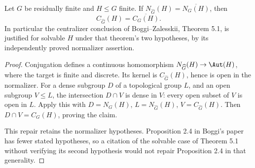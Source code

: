 Let \(G\) be residually finite and \(H\leq G\) finite. If
\(N_{\widehat G}(H)=\overline{N_G(H)}\), then
\[
 C_{\widehat G}(H)=\overline{C_G(H)}.
\]
In particular the centralizer conclusion of Boggi--Zalesskii,
Theorem 5.1, is justified for solvable \(H\) under that theorem's two
hypotheses, by its independently proved normalizer assertion.
\begin{proof}
Conjugation defines a continuous homomorphism
\(N_{\widehat G}(H)\to\Aut(H)\), where the target is finite and discrete.
Its kernel is \(C_{\widehat G}(H)\), hence is open in the normalizer.
For a dense subgroup \(D\) of a topological group \(L\), and an open
subgroup \(V\leq L\), the intersection \(D\cap V\) is dense in \(V\):
every open subset of \(V\) is open in \(L\). Apply this with
\(D=N_G(H)\), \(L=N_{\widehat G}(H)\), \(V=C_{\widehat G}(H)\).
Then \(D\cap V=C_G(H)\), proving the claim.

This repair retains the normalizer hypotheses. Proposition 2.4 in
Boggi's paper has fewer stated hypotheses, so a citation of the solvable
case of Theorem 5.1 without verifying its second hypothesis would not
repair Proposition 2.4 in that generality.
\end{proof}

